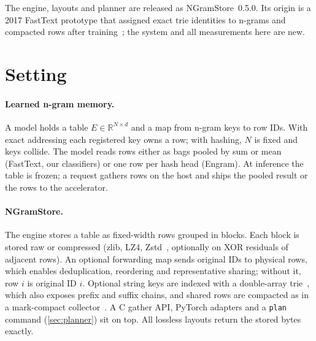 \documentclass[10pt]{article}
\begin{document}
The engine, layouts and planner are released as NGramStore~0.5.0. Its origin is a 2017 FastText prototype that assigned exact trie identities to n-grams and compacted rows after training~\citep{du2025mefasttext}; the system and all measurements here are new.

\section{Setting}
\label{sec:setting}

\paragraph{Learned n-gram memory.} A model holds a table $E \in \mathbb{R}^{N\times d}$ and a map from n-gram keys to row IDs. With exact addressing each registered key owns a row; with hashing, $N$ is fixed and keys collide. The model reads rows either as bags pooled by sum or mean (FastText, our classifiers) or one row per hash head (Engram). At inference the table is frozen; a request gathers rows on the host and ships the pooled result or the rows to the accelerator.

\paragraph{NGramStore.} The engine stores a table as fixed-width rows grouped in blocks. Each block is stored raw or compressed (zlib, LZ4, Zstd~\citep{collet2021zstd}, optionally on XOR residuals of adjacent rows). An optional forwarding map sends original IDs to physical rows, which enables deduplication, reordering and representative sharing; without it, row $i$ is original ID $i$. Optional string keys are indexed with a double-array trie~\citep{aoe1989efficient}, which also exposes prefix and suffix chains, and shared rows are compacted as in a mark-compact collector~\citep{jones2011gc}. A C gather API, PyTorch adapters and a \texttt{plan} command (\cref{sec:planner}) sit on top. All lossless layouts return the stored bytes exactly.
\end{document}
